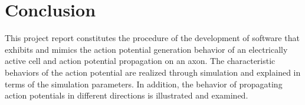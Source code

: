 \documentclass{IEEEtran}
\begin{document}
\section{Conclusion}
This project report constitutes the procedure of the development of software that exhibits and mimics the action potential generation behavior of an electrically active cell and action potential propagation on an axon. The characteristic behaviors of the action potential are realized through simulation and explained in terms of the simulation parameters. In addition, the behavior of propagating action potentials in different directions is illustrated and examined.

\printbibliography{}
\end{document}
